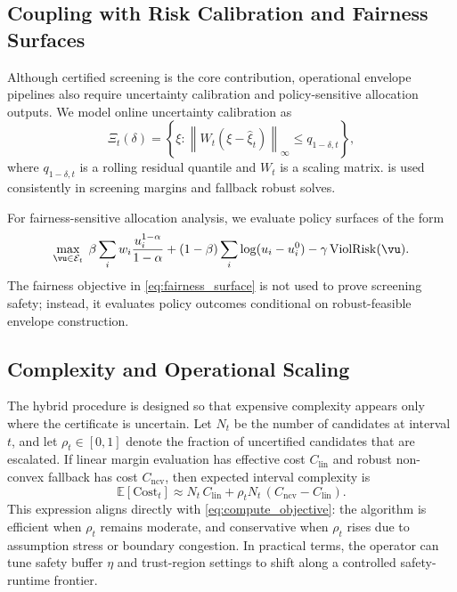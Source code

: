 \documentclass{article} %
\begin{document}
\subsection{Coupling with Risk Calibration and Fairness Surfaces}
Although certified screening is the core contribution, operational envelope pipelines also require uncertainty calibration and policy-sensitive allocation outputs. We model online uncertainty calibration as
\begin{equation}
\Xi_t(\delta)=\left\{\xi:\left\|W_t(\xi-\hat{\xi}_t)\right\|_{\infty}\le q_{1-\delta,t}\right\},
\label{eq:uncertainty_set}
\end{equation}
where $q_{1-\delta,t}$ is a rolling residual quantile and $W_t$ is a scaling matrix.  is used consistently in screening margins and fallback robust solves.

For fairness-sensitive allocation analysis, we evaluate policy surfaces of the form
\begin{equation}
\max_{\vu\in\mathcal{E}_t}\;\beta\sum_i w_i\frac{u_i^{1-\alpha}}{1-\alpha} + (1-\beta)\sum_i\log(u_i-u_i^0) - \gamma\,\mathrm{ViolRisk}(\vu).
\label{eq:fairness_surface}
\end{equation}
The fairness objective in \eqref{eq:fairness_surface} is not used to prove screening safety; instead, it evaluates policy outcomes conditional on robust-feasible envelope construction.

\subsection{Complexity and Operational Scaling}
The hybrid procedure is designed so that expensive complexity appears only where the certificate is uncertain. Let $N_t$ be the number of candidates at interval $t$, and let $\rho_t\in[0,1]$ denote the fraction of uncertified candidates that are escalated. If linear margin evaluation has effective cost $C_{\mathrm{lin}}$ and robust non-convex fallback has cost $C_{\mathrm{ncv}}$, then expected interval complexity is
\[
\mathbb{E}[\mathrm{Cost}_t] \approx N_t\,C_{\mathrm{lin}} + \rho_t N_t\,(C_{\mathrm{ncv}}-C_{\mathrm{lin}}).
\]
This expression aligns directly with \eqref{eq:compute_objective}: the algorithm is efficient when $\rho_t$ remains moderate, and conservative when $\rho_t$ rises due to assumption stress or boundary congestion. In practical terms, the operator can tune safety buffer $\eta$ and trust-region settings to shift along a controlled safety-runtime frontier.
\end{document}
